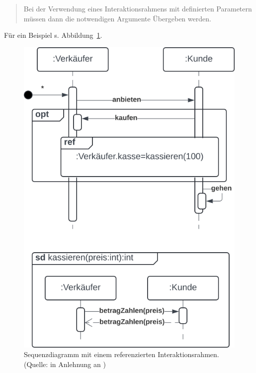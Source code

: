 \blockquote[{\cite[35]{Buh09}}]{
Bei der Verwendung eines Interaktionsrahmens mit definierten Parametern müssen dann die notwendigen Argumente Übergeben werden.
}

Für ein Beispiel s. Abbildung~\ref{fig:interaktionsreferenz}.

\begin{figure}
    \centering
    \includegraphics[scale=0.5]{part three/Sequenzdiagramme/img/interaktionsreferenz}
    \caption{Sequenzdiagramm mit einem referenzierten Interaktionsrahmen. (Quelle: in Anlehnung an \cite[35]{Buh09})}
    \label{fig:interaktionsreferenz}
\end{figure}
